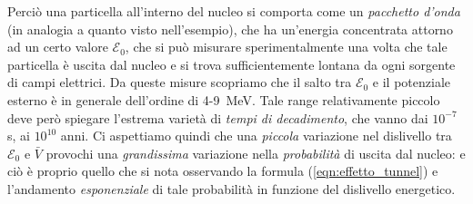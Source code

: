\documentclass[../../FisicaTeorica.tex]{subfiles}
\begin{document}
\begin{itemize}
Perciò una particella all'interno del nucleo si comporta come un \textit{pacchetto d'onda} (in analogia a quanto visto nell'esempio), che ha un'energia concentrata attorno ad un certo valore $\mathcal{E}_0$, che si può misurare sperimentalmente una volta che tale particella è uscita dal nucleo e si trova sufficientemente lontana da ogni sorgente di campi elettrici. Da queste misure scopriamo che il salto tra $\mathcal{E}_0$ e il potenziale esterno è in generale dell'ordine di \num{4}-\SI{9}{\mega\eV}. Tale range relativamente piccolo deve però spiegare l'estrema varietà di \textit{tempi di decadimento}, che vanno dai $10^{-7}$\si{\s}, ai $10^{10}$ anni. Ci aspettiamo quindi che una \textit{piccola} variazione nel dislivello tra $\mathcal{E}_0$ e $\bar{V}$ provochi una \textit{grandissima} variazione nella \textit{probabilità} di uscita dal nucleo: e ciò è proprio quello che si nota osservando la formula (\ref{eqn:effetto_tunnel}) e l'andamento \textit{esponenziale} di tale probabilità in funzione del dislivello energetico.


\end{itemize}
\end{document}
